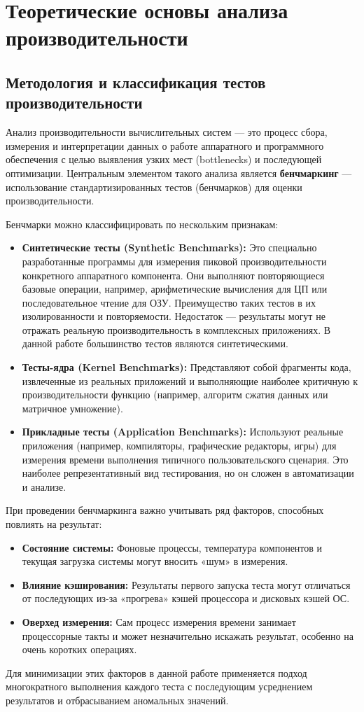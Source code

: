 \section{Теоретические основы анализа производительности}

\subsection{Методология и классификация тестов производительности}

Анализ производительности вычислительных систем — это процесс сбора, измерения и интерпретации данных о работе аппаратного и программного обеспечения с целью выявления узких мест (bottlenecks) и последующей оптимизации. Центральным элементом такого анализа является \textbf{бенчмаркинг} — использование стандартизированных тестов (бенчмарков) для оценки производительности.

Бенчмарки можно классифицировать по нескольким признакам:
\begin{itemize}
    \item \textbf{Синтетические тесты (Synthetic Benchmarks):} Это специально разработанные программы для измерения пиковой производительности конкретного аппаратного компонента. Они выполняют повторяющиеся базовые операции, например, арифметические вычисления для ЦП или последовательное чтение для ОЗУ. Преимущество таких тестов в их изолированности и повторяемости. Недостаток — результаты могут не отражать реальную производительность в комплексных приложениях. В данной работе большинство тестов являются синтетическими.
    \item \textbf{Тесты-ядра (Kernel Benchmarks):} Представляют собой фрагменты кода, извлеченные из реальных приложений и выполняющие наиболее критичную к производительности функцию (например, алгоритм сжатия данных или матричное умножение).
    \item \textbf{Прикладные тесты (Application Benchmarks):} Используют реальные приложения (например, компиляторы, графические редакторы, игры) для измерения времени выполнения типичного пользовательского сценария. Это наиболее репрезентативный вид тестирования, но он сложен в автоматизации и анализе.
\end{itemize}

При проведении бенчмаркинга важно учитывать ряд факторов, способных повлиять на результат:
\begin{itemize}
    \item \textbf{Состояние системы:} Фоновые процессы, температура компонентов и текущая загрузка системы могут вносить «шум» в измерения.
    \item \textbf{Влияние кэширования:} Результаты первого запуска теста могут отличаться от последующих из-за «прогрева» кэшей процессора и дисковых кэшей ОС.
    \item \textbf{Оверхед измерения:} Сам процесс измерения времени занимает процессорные такты и может незначительно искажать результат, особенно на очень коротких операциях.
\end{itemize}
Для минимизации этих факторов в данной работе применяется подход многократного выполнения каждого теста с последующим усреднением результатов и отбрасыванием аномальных значений.

